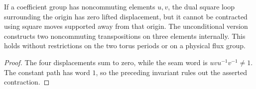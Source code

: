 \begin{lemma}
    \label{lem:peps_dual_restricted_displacement_obstruction}
    \leanok
    If a coefficient group has noncommuting elements $u,v$, the dual square loop
    surrounding the origin has zero lifted displacement, but it cannot
    be contracted using square moves supported away from that origin.
    The unconditional version constructs two noncommuting transpositions
    on three elements internally. This holds without restrictions on the
    two torus periods or on a physical flux group.
\end{lemma}
\begin{proof}\leanok
    The four displacements sum to zero, while the seam word is
    $uvu^{-1}v^{-1}\ne1$. The constant path has word $1$, so the preceding
    invariant rules out the asserted contraction.
\end{proof}
